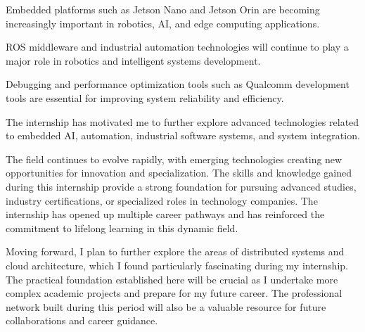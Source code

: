 \documentclass[12pt,a4paper]{report}
\begin{document}
Embedded platforms such as Jetson Nano and Jetson Orin are becoming increasingly important in robotics, AI, and edge computing applications.


ROS middleware and industrial automation technologies will continue to play a major role in robotics and intelligent systems development.


Debugging and performance optimization tools such as Qualcomm development tools are essential for improving system reliability and efficiency.


The internship has motivated me to further explore advanced technologies related to embedded AI, automation, industrial software systems, and system integration.


The field continues to evolve rapidly, with emerging technologies creating new opportunities for innovation and specialization. The skills and knowledge gained during this internship provide a strong foundation for pursuing advanced studies, industry certifications, or specialized roles in technology companies. The internship has opened up multiple career pathways and has reinforced the commitment to lifelong learning in this dynamic field.


Moving forward, I plan to further explore the areas of distributed systems and cloud architecture, which I found particularly fascinating during my internship. The practical foundation established here will be crucial as I undertake more complex academic projects and prepare for my future career. The professional network built during this period will also be a valuable resource for future collaborations and career guidance.
\end{document}
